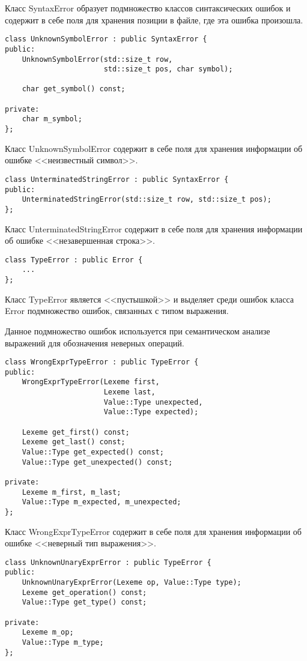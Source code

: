 Класс SyntaxError образует подмножество классов
синтаксических ошибок и содержит в себе поля для хранения
позиции в файле, где эта ошибка произошла.

\begin{verbatim}
class UnknownSymbolError : public SyntaxError {
public:
    UnknownSymbolError(std::size_t row, 
                       std::size_t pos, char symbol);

    char get_symbol() const;

private:
    char m_symbol;
};
\end{verbatim}

Класс UnknownSymbolError содержит в себе поля 
для хранения информации об ошибке <<неизвестный символ>>.

\begin{verbatim}
class UnterminatedStringError : public SyntaxError {
public:
    UnterminatedStringError(std::size_t row, std::size_t pos);
};
\end{verbatim}

Класс UnterminatedStringError содержит в себе поля
для хранения информации об ошибке <<незавершенная строка>>.

\begin{verbatim}
class TypeError : public Error {
    ...
};
\end{verbatim}

Класс TypeError является <<пустышкой>> и выделяет 
среди ошибок класса Error подмножество ошибок,
связанных с типом выражения.

Данное подмножество ошибок используется при семантическом
анализе выражений для обозначения неверных операций.

\begin{verbatim}
class WrongExprTypeError : public TypeError {
public:
    WrongExprTypeError(Lexeme first, 
                       Lexeme last, 
                       Value::Type unexpected, 
                       Value::Type expected);

    Lexeme get_first() const;
    Lexeme get_last() const;
    Value::Type get_expected() const;
    Value::Type get_unexpected() const;

private:
    Lexeme m_first, m_last;
    Value::Type m_expected, m_unexpected;
};
\end{verbatim}

Класс WrongExprTypeError содержит в себе поля 
для хранения информации об ошибке <<неверный тип выражения>>.

\begin{verbatim}
class UnknownUnaryExprError : public TypeError {
public:
    UnknownUnaryExprError(Lexeme op, Value::Type type);
    Lexeme get_operation() const;
    Value::Type get_type() const;

private:
    Lexeme m_op;
    Value::Type m_type;
};
\end{verbatim}

